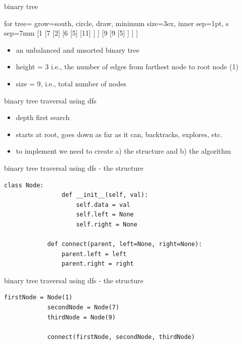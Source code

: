 \documentclass{beamer}
\begin{document}
	\begin{frame}{binary tree}
		\begin{center}
			\begin{forest}
				for tree={
					grow=south,
					circle, draw, minimum size=3ex, inner sep=1pt,
					s sep=7mm
				}
				[1
				[7
				[2]
				[6
				[5]
				[11]
				]
				]
				[9
				[9
				[5]
				]
				]
				]
			\end{forest}
		\end{center}
		
		\begin{itemize}
			\item[] an unbalanced and unsorted binary tree
			
			\item[] height = 3 i.e., the number of edges from farthest node to root node (1)
			
			\item[] size = 9, i.e., total number of nodes
		\end{itemize}
	\end{frame}
	
	\begin{frame}{binary tree traversal using dfs}
		\begin{itemize}
			\item[] depth first search
			\item[] starts at root, goes down as far as it can, backtracks, explores, etc.
			\item[] to implement we need to create a) the structure and b) the algorithm
		\end{itemize}
	\end{frame}
	
	\begin{frame}[fragile]{binary tree traversal using dfs - the structure}
		\begin{lstlisting}[style=pythonstyle]
			class Node:
				def __init__(self, val):
					self.data = val
					self.left = None
					self.right = None
			
			def connect(parent, left=None, right=None):
				parent.left = left
				parent.right = right
		\end{lstlisting}
	\end{frame}
	
	\begin{frame}[fragile]{binary tree traversal using dfs - the structure}
		\begin{lstlisting}[style=pythonstyle]
			firstNode = Node(1)
			secondNode = Node(7)
			thirdNode = Node(9)
			
			connect(firstNode, secondNode, thirdNode)
		\end{lstlisting}
	\end{frame}
	
\end{document}
